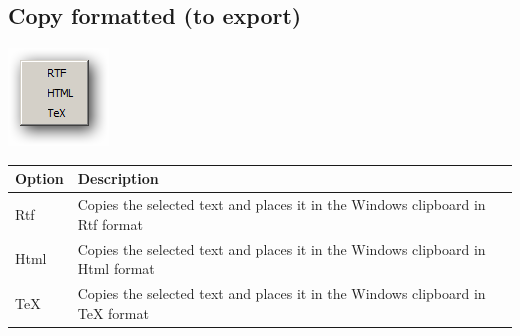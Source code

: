 \hypertarget{menu_edit_copyformatted}{}
\subsection{Copy formatted (to export)}

\includegraphics[scale=0.50]{./res/menu_edit_copyformated.png}\\

\begin{scriptsize}\begin{tabularx}{\textwidth}{>{\hsize=0.1\hsize}X>{\hsize=0.7\hsize}X}\\
    \hline
    \textbf{Option} & \textbf{Description} \\
    \hline
    Rtf & Copies the selected text and places it in the Windows clipboard in Rtf format \\
    Html & Copies the selected text and places it in the Windows clipboard in Html format \\
    TeX & Copies the selected text and places it in the Windows clipboard in TeX format \\
    \hline
  \end{tabularx}\end{scriptsize}
